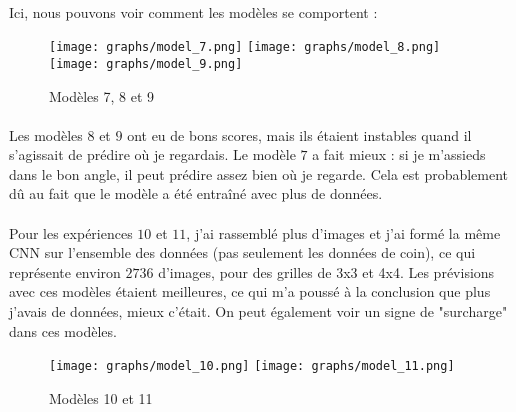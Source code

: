 \paragraph{}
Ici, nous pouvons voir comment les modèles se comportent :

\begin{figure}[H]
    \centering
    \texttt{[image: graphs/model\_7.png]}
    \texttt{[image: graphs/model\_8.png]}
    \texttt{[image: graphs/model\_9.png]}
    \caption{Modèles 7, 8 et 9}
\end{figure}

\paragraph{}
Les modèles $8$ et $9$ ont eu de bons scores, mais ils étaient instables quand il s'agissait de prédire où je regardais.
Le modèle $7$ a fait mieux : si je m'assieds dans le bon angle, il peut prédire assez bien où je regarde.
Cela est probablement dû au fait que le modèle a été entraîné avec plus de données.


\paragraph{}
Pour les expériences $10$ et $11$, j'ai rassemblé plus d'images et j'ai formé la même CNN sur l'ensemble des données (pas seulement les données de coin), ce qui représente environ $2736$ d'images, pour des grilles de 3x3 et 4x4.
Les prévisions avec ces modèles étaient meilleures, ce qui m'a poussé à la conclusion que plus j'avais de données, mieux c'était.
On peut également voir un signe de "surcharge" dans ces modèles.


\begin{figure}[H]
    \centering
    \texttt{[image: graphs/model\_10.png]}
    \texttt{[image: graphs/model\_11.png]}
    \caption{Modèles 10 et 11}
\end{figure}

